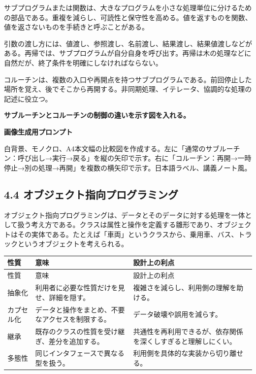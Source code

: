 \documentclass[a4paper,11pt]{ltjsarticle}
\begin{document}
サブプログラムまたは関数は、大きなプログラムを小さな処理単位に分けるための部品である。重複を減らし、可読性と保守性を高める。値を返すものを関数、値を返さないものを手続きと呼ぶことがある。

引数の渡し方には、値渡し、参照渡し、名前渡し、結果渡し、結果値渡しなどがある。再帰では、サブプログラムが自分自身を呼び出す。再帰は木の処理などに自然だが、終了条件を明確にしなければならない。

コルーチンは、複数の入口や再開点を持つサブプログラムである。前回停止した場所を覚え、後でそこから再開する。非同期処理、イテレータ、協調的な処理の記述に役立つ。

\begin{todobox}
\textbf{サブルーチンとコルーチンの制御の違いを示す図を入れる。}\par
\textbf{画像生成用プロンプト}\par
白背景、モノクロ、A4本文幅の比較図を作成する。左に「通常のサブルーチン：呼び出し→実行→戻る」を縦の矢印で示す。右に「コルーチン：再開→一時停止→別の処理→再開」を複数の横矢印で示す。日本語ラベル、講義ノート風。

\end{todobox}

\subsection{4.4 オブジェクト指向プログラミング}

オブジェクト指向プログラミングは、データとそのデータに対する処理を一体として扱う考え方である。クラスは属性と操作を定義する雛形であり、オブジェクトはその実体である。たとえば「車両」というクラスから、乗用車、バス、トラックというオブジェクトを考えられる。

\begin{longtable}{>{\raggedright\arraybackslash}p{}>{\raggedright\arraybackslash}p{}>{\raggedright\arraybackslash}p{}}
\toprule
性質 & 意味 & 設計上の利点 \\
\midrule
\endfirsthead
\toprule
性質 & 意味 & 設計上の利点 \\
\midrule
\endhead
抽象化 & 利用者に必要な性質だけを見せ、詳細を隠す。 & 複雑さを減らし、利用側の理解を助ける。 \\
カプセル化 & データと操作をまとめ、不要なアクセスを制限する。 & データ破壊や誤用を減らす。 \\
継承 & 既存のクラスの性質を受け継ぎ、差分を追加する。 & 共通性を再利用できるが、依存関係を深くしすぎると理解しにくい。 \\
多態性 & 同じインタフェースで異なる型を扱う。 & 利用側を具体的な実装から切り離せる。 \\
\bottomrule
\end{longtable}
\end{document}
